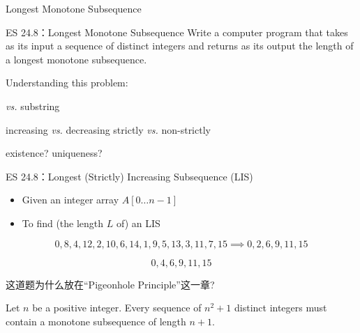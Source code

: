 \begin{frame}{}
  \centerline{\LARGE Longest Monotone Subsequence}
\end{frame}

\begin{frame}{}
  \begin{exampleblock}{ES 24.8：Longest Monotone Subsequence}
    Write a computer program that takes as its input a sequence of distinct integers
    and returns as its output the length of a longest monotone subsequence.
  \end{exampleblock}

  \vspace{0.50cm}
  \pause
  Understanding this problem:

  \vspace{0.20cm}
  \begin{description}[Subsequence]
    \pause
    \item[Subsequence] \emph{vs.} substring
    \pause
  \item[Monotone] increasing \emph{vs.} decreasing \pause \qquad strictly \emph{vs.} non-strictly
    \pause
    \item[Longest] existence? uniqueness?
  \end{description}
\end{frame}

\begin{frame}{}
  \begin{exampleblock}{ES 24.8：Longest (Strictly) Increasing Subsequence (LIS)}
    \begin{itemize}
      \item Given an integer array $A[0 \ldots n-1]$
      \item To find (the length $L$ of) an LIS
    \end{itemize}
  \end{exampleblock}

  \vspace{0.30cm}
  \[
    0, 8, 4, 12, 2, 10, 6, 14, 1, 9, 5, 13, 3, 11, 7, 15 \implies 0, 2, 6, 9, 11, 15
  \]

  \pause
  \[
    0, 4, 6, 9, 11, 15
  \]
\end{frame}

\begin{frame}{}
  \begin{center}
     这道题为什么放在``Pigeonhole Principle''这一章?
  \end{center}

  \pause

  \pause
  \begin{theorem}
     Let $n$ be a positive integer. 
     Every sequence of $n^2 + 1$ distinct integers must contain a monotone subsequence of length $n + 1$.
  \end{theorem}
\end{frame}

